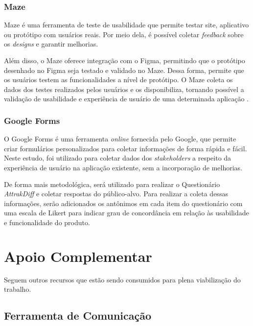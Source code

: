 \subsubsection{Maze}
\label{sec:Maze}
Maze é uma ferramenta de teste de usabilidade que permite testar site, aplicativo ou protótipo com usuários reais. Por meio dela, é possível coletar \textit{feedback} sobre 
os \textit{designs} e garantir melhorias.

Além disso, o Maze oferece integração com o Figma, permitindo que o protótipo desenhado no Figma seja testado e validado no Maze. Dessa forma, permite que os usuários 
testem as funcionalidades a nível de protótipo. O Maze coleta os dados dos testes realizados pelos usuários e os disponibiliza, tornando possível a validação de usabilidade 
e experiência de usuário de uma determinada aplicação \cite{maze}.

\subsubsection{Google Forms}
\label{sec:Google Forms}
O Google Forms \cite{googleforms} é uma ferramenta \textit{online} fornecida pelo Google, que permite criar formulários personalizados para coletar informações de forma rápida e fácil. Neste estudo, foi 
utilizado para coletar dados dos \textit{stakeholders} a respeito da experiência de usuário na aplicação existente, sem a incorporação de melhorias.

De forma mais metodológica, será utilizado para realizar o Questionário \textit{AttrakDiff} e coletar respostas do público-alvo. Para realizar a coleta dessas informações, serão adicionados 
os antônimos em cada item do questionário com uma escala de Likert para indicar grau de concordância em relação às usabilidade e funcionalidade do produto.

\section{Apoio Complementar}
\label{sec:Apoio Complementar}
Seguem outros recursos que estão sendo consumidos para plena viabilização do trabalho.

\subsection{Ferramenta de Comunicação}
\label{sec:Ferramenta de Comunicação}


